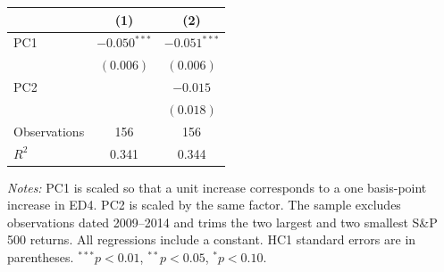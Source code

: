 \begin{tabular}{@{}lcc@{}}
\toprule
& (1) & (2) \\
\midrule
PC1  & $-0.050^{***}$ & $-0.051^{***}$ \\
& $(0.006)$ & $(0.006)$ \\
\addlinespace
PC2  & & $-0.015$ \\
& & $(0.018)$ \\
\midrule
Observations & 156 & 156 \\
$R^2$ & 0.341 & 0.344 \\
\bottomrule
\end{tabular}

\smallskip
\begin{minipage}{0.72\linewidth}\footnotesize
\textit{Notes:} PC1 is scaled so that a unit increase corresponds to a one basis-point increase in ED4. PC2 is scaled by the same factor. The sample excludes observations dated 2009--2014 and trims the two largest and two smallest S\&P 500 returns. All regressions include a constant. HC1 standard errors are in parentheses. $^{***}p<0.01$, $^{**}p<0.05$, $^{*}p<0.10$.
\end{minipage}
